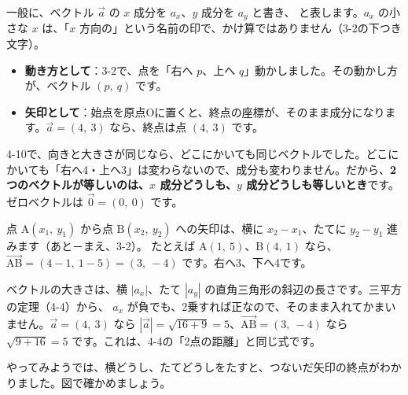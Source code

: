 \par\vspace{4pt}
一般に、ベクトル $\vec{a}$ の $x$ 成分を $a_x$、$y$ 成分を $a_y$ と書き、
と表します。$a_x$ の小さな $x$ は、「$x$ 方向の」という名前の印で、かけ算ではありません（3-2の下つき文字）。

\begin{itemize}[leftmargin=1.2\zw, itemsep=2pt, topsep=1pt, label={\color{\bkTT}●}]
\item \textbf{動き方として}：3-2で、点を「右へ $p$、上へ $q$」動かしました。その動かし方が、ベクトル $(p,\ q)$ です。
\item \textbf{矢印として}：始点を原点Oに置くと、終点の座標が、そのまま成分になります。$\vec{a}=(4,\ 3)$ なら、終点は点 $(4,\ 3)$ です。
\end{itemize}

4-10で、向きと大きさが同じなら、どこにかいても同じベクトルでした。どこにかいても「右へ4・上へ3」は変わらないので、成分も変わりません。だから、\textbf{2つのベクトルが等しいのは、$x$ 成分どうしも、$y$ 成分どうしも等しいとき}です。ゼロベクトルは $\vec{0}=(0,\ 0)$ です。

点 $\mathrm{A}(x_1,\ y_1)$ から点 $\mathrm{B}(x_2,\ y_2)$ への矢印は、横に $x_2-x_1$、たてに $y_2-y_1$ 進みます（あと－まえ、3-2）。
たとえば $\mathrm{A}(1,\ 5)$、$\mathrm{B}(4,\ 1)$ なら、$\overrightarrow{\mathrm{AB}}=(4-1,\ 1-5)=(3,\ -4)$ です。右へ3、下へ4です。

ベクトルの大きさは、横 $|a_x|$、たて $|a_y|$ の直角三角形の斜辺の長さです。三平方の定理（4-4）から、
$a_x$ が負でも、2乗すれば正なので、そのまま入れてかまいません。$\vec{a}=(4,\ 3)$ なら $|\vec{a}|=\sqrt{16+9}=5$、$\overrightarrow{\mathrm{AB}}=(3,\ -4)$ なら $\sqrt{9+16}=5$ です。これは、4-4の「2点の距離」と同じ式です。

{}


\label{bk:4-11:keisan}やってみようでは、横どうし、たてどうしをたすと、つないだ矢印の終点がわかりました。図で確かめましょう。

